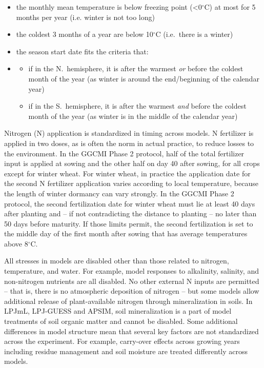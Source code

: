 \documentclass[gmd, manuscript]{copernicus} %
\begin{document}
\begin{itemize}
  \item{the monthly mean temperature is below freezing point (<0$^\circ$C) at most for 5 months per year (i.e. winter is not too long)}
  \item{the coldest 3 months of a year are below 10$^\circ$C (i.e.\ there is a winter)}
  \item{the season start date fits the criteria that:}
  \item[]{
    \begin{itemize}  
      \item{if in the N.\ hemisphere, it is after the warmest \textit{or} before the coldest month of the year (as winter is around the end/beginning of the calendar year)}
      \item{if in the S.\ hemisphere, it is after the warmest \textit{and} before the coldest month of the year (as winter is in the middle of the calendar year)}
      \end{itemize}
      }
\end{itemize}

Nitrogen (N) application is standardized in timing across models. 
N fertilizer is applied in two doses, as is often the norm in actual practice, to reduce losses to the environment. 
In the GGCMI Phase 2 protocol, half of the total fertilizer input is applied at sowing and the other half on day 40 after sowing, for all crops except for winter wheat. 
For winter wheat, in practice the application date for the second N fertilizer application varies according to local temperature, because the length of winter dormancy can vary strongly. 
In the GGCMI Phase 2 protocol, the second fertilization date for winter wheat must lie at least 40 days after planting and -- if not contradicting the distance to planting -- no later than 50 days before maturity.
If those limits permit, the second fertilization is set to the middle day of the first month after sowing that has average temperatures above 8$^\circ$C.

All stresses in models are disabled other than those related to nitrogen, temperature, and water. 
For example, model responses to alkalinity, salinity, and non-nitrogen nutrients are all disabled. 
No other external N inputs are permitted -- that is, there is no atmospheric deposition of nitrogen --  but some models allow additional release of plant-available nitrogen through mineralization in soils. 
In LPJmL, LPJ-GUESS and APSIM, soil mineralization is a part of model treatments of soil organic matter and cannot be disabled.
Some additional differences in model structure mean that several key factors are not standardized across the experiment. 
For example, carry-over effects across growing years including residue management and soil moisture are treated differently across models.
\end{document}
